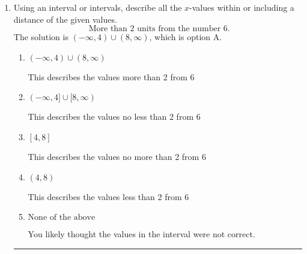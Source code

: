\documentclass{extbook}[14pt]
\newcommand{\litem}[1]{\item #1

\rule{\textwidth}{0.4pt}}
\begin{document}
\begin{enumerate}
{\begin{enumerate}[label=\Alph*.]
 $(1.003, \infty)$, which corresponds to switching the direction of the interval AND negating the endpoint. You likely did this if you did not flip the inequality when dividing by a negative as well as not moving values over to a side properly.
\item \( (-\infty, a), \text{ where } a \in [-1.88, 0.6] \)

* $(-\infty, -1.003)$, which is the correct option.
\item \( (a, \infty), \text{ where } a \in [-2.4, 0.22] \)

 $(-1.003, \infty)$, which corresponds to switching the direction of the interval. You likely did this if you did not flip the inequality when dividing by a negative!
\item \( (-\infty, a), \text{ where } a \in [0.67, 1.12] \)

 $(-\infty, 1.003)$, which corresponds to negating the endpoint of the solution.
\item \( \text{None of the above}. \)

You may have chosen this if you thought the inequality did not match the ends of the intervals.
\end{enumerate}

\textbf{General Comment:} Remember that less/greater than or equal to includes the endpoint, while less/greater do not. Also, remember that you need to flip the inequality when you multiply or divide by a negative.
}
\litem{
Using an interval or intervals, describe all the $x$-values within or including a distance of the given values.
\[ \text{ More than } 2 \text{ units from the number } 6. \]The solution is \( (-\infty, 4) \cup (8, \infty) \), which is option A.\begin{enumerate}[label=\Alph*.]
\item \( (-\infty, 4) \cup (8, \infty) \)

This describes the values more than 2 from 6
\item \( (-\infty, 4] \cup [8, \infty) \)

This describes the values no less than 2 from 6
\item \( [4, 8] \)

This describes the values no more than 2 from 6
\item \( (4, 8) \)

This describes the values less than 2 from 6
\item \( \text{None of the above} \)

You likely thought the values in the interval were not correct.
\end{enumerate}

}
\end{enumerate}
\end{document}
